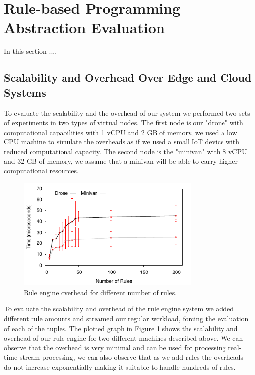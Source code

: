 \section{Rule-based Programming Abstraction Evaluation}

In this section ....

\subsection{Scalability and Overhead Over Edge and Cloud Systems}

To evaluate the scalability and the overhead of our system we performed two sets of experiments in two types of virtual nodes. The first node is our "drone" with computational capabilities with 1 vCPU and 2 GB of memory, we used a low CPU machine to simulate the overheads as if we used a small IoT device with reduced computational capacity. The second node is the "minivan" with 8 vCPU and 32 GB of memory, we assume that a minivan will be able to carry higher computational resources.

\begin{figure}[h!]
  \centering
  \includegraphics[width=0.8\textwidth]{Results/RuleEngine}
  \caption{Rule engine overhead for different number of rules.}
  \label{fig:RuleEngine}
\end{figure}

To evaluate the scalability and overhead of the rule engine system we added different rule amounts and streamed our regular workload, forcing the evaluation of each of the tuples. The plotted graph in Figure  \ref{fig:RuleEngine} shows the scalability and overhead of our rule engine for two different machines described above. We can observe that the overhead is very minimal and can be used for processing real-time stream processing, we can also observe that as we add rules the overheads do not increase exponentially making it suitable to handle hundreds of rules.

